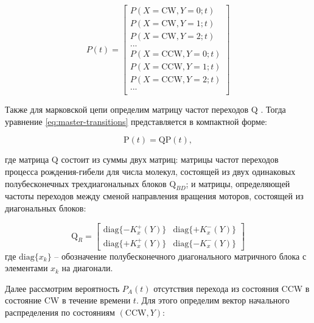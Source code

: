 \begin{equation}
    P(t) = \begin{bmatrix}
    P(X = \mathrm{CW}, Y = 0; t)\\
    P(X = \mathrm{CW}, Y = 1; t)\\
    P(X = \mathrm{CW}, Y = 2; t)\\
    ...\\
    P(X = \mathrm{CCW}, Y = 0; t)\\
    P(X = \mathrm{CCW}, Y = 1; t)\\
    P(X = \mathrm{CCW}, Y = 2; t)\\
    ...\\
    \end{bmatrix}
\label{eq:state-probs}
\end{equation}

Также для марковской цепи определим матрицу частот переходов $\boldsymbol{\mathrm{Q}}$ \cite{}. Тогда уравнение \cref{eq:master-transitions} представляется в компактной форме: 

\begin{equation}
    \boldsymbol{\mathrm{P}}(t) = \boldsymbol{\mathrm{Q}} \boldsymbol{\mathrm{P}}(t),
    \label{eq:master-transitions-compact}
\end{equation}

где матрица $\boldsymbol{\mathrm{Q}}$ состоит из суммы двух матриц: матрицы частот переходов процесса рождения-гибели для числа молекул, состоящей из двух одинаковых полубесконечных трехдиагональных блоков $\boldsymbol{\mathrm{Q}}_{BD}$; и матрицы, определяющей частоты переходов между сменой направления вращения моторов, состоящей из диагональных блоков:

\begin{equation}
    \boldsymbol{\mathrm{Q}}_{R} = 
    \begin{bmatrix} \mathrm{diag}\{-K^+_x (Y)\}&\mathrm{diag}\{+K^-_x (Y)\}\\ \mathrm{diag}\{+K^+_x (Y)\}&\mathrm{diag}\{-K^-_x (Y) \} \end{bmatrix}
    \label{eq:transition-block}
\end{equation}
где $\mathrm{diag}\{x_k\}$ -- обозначение полубесконечного диагонального матричного блока с элементами $x_k$ на диагонали.

Далее рассмотрим вероятность $P_A(t)$ отсутствия перехода из состояния CCW в состояние CW в течение времени $t$. Для этого определим вектор начального распределения по состояниям $(\mathrm{CCW}, Y)$:

